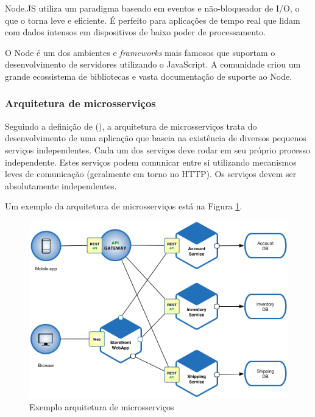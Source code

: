 Node.JS utiliza um paradigma baseado em eventos e não-bloqueador de I/O, o que o torna leve e eficiente. É perfeito para aplicações de tempo real que lidam com dados intensos em dispositivos de baixo poder de processamento. \cite{Sapes2016}

O Node é um dos ambientes e \textit{frameworks} mais famosos que suportam o desenvolvimento de servidores utilizando o JavaScript. A comunidade criou um grande ecossistema de bibliotecas e vasta documentação de suporte ao Node. \cite{Tilkov2010}

\subsubsection{Arquitetura de microsserviços}

Seguindo a definição de \citeauthor{ms1} (\citeyear{ms1}), a arquitetura de microsserviços trata do desenvolvimento de uma aplicação que baseia na existência de diversos pequenos serviços independentes. Cada um dos serviços deve rodar em seu próprio processo independente. Estes serviços podem comunicar entre si utilizando mecanismos leves de comunicação (geralmente em torno no HTTP). Os serviços devem ser absolutamente independentes.

Um exemplo da arquitetura de microsserviços está na Figura \ref{fig:arquitetura-microsservicos}.

\begin{figure}[htbp]
	\centering
	\includegraphics[width=1\linewidth]{figuras/Microservice_Architecture.png}
	\caption{Exemplo arquitetura de microsserviços}
	\label{fig:arquitetura-microsservicos}
\end{figure}


